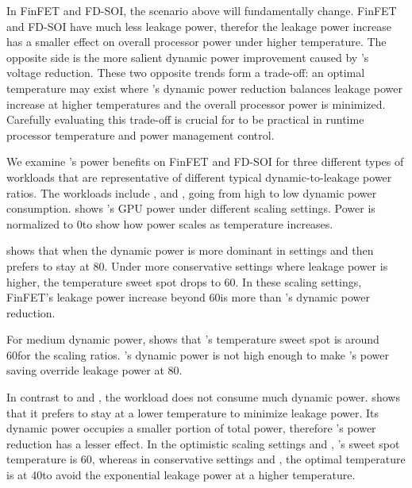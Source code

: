 In FinFET and FD-SOI, the scenario above will fundamentally change. FinFET and FD-SOI have much less leakage power, therefor the leakage power increase has a smaller effect on overall processor power under higher temperature. The opposite side is the more salient dynamic power improvement caused by \tistate's voltage reduction. These two opposite trends form a trade-off: an optimal temperature may exist where \tistate's dynamic power reduction balances leakage power increase at higher temperatures and the overall processor power is minimized. Carefully evaluating this trade-off is crucial for \tistate to be practical in runtime processor temperature and power management control. 


We examine \tistate's power benefits on FinFET and FD-SOI for three different types of workloads that are representative of different typical dynamic-to-leakage power ratios. The workloads include ,  and , going from high to low dynamic power consumption.  shows \tistate's GPU power under different scaling settings. Power is normalized to 0\C to show how power scales as temperature increases. 

 shows that when the dynamic power is more dominant in settings  and  then  prefers to stay at 80\C. Under more conservative settings where leakage power is higher, the temperature sweet spot drops to 60\C. In these scaling settings, FinFET's leakage power increase beyond 60\C is more than \tistate's dynamic power reduction.

For medium dynamic power,  shows that 's temperature sweet spot is around 60\C for the scaling ratios. 's dynamic power is not high enough to make \tistate's power saving override leakage power at 80\C. 

In contrast to  and , the workload  does not consume much dynamic power.  shows that it prefers to stay at a lower temperature to minimize leakage power. Its dynamic power occupies a smaller portion of total power, therefore \tistate's power reduction has a lesser effect. In the optimistic scaling settings  and , 's sweet spot temperature is 60\C, whereas in conservative settings  and , the optimal temperature is at 40\C to avoid the exponential leakage power at a higher temperature. 

